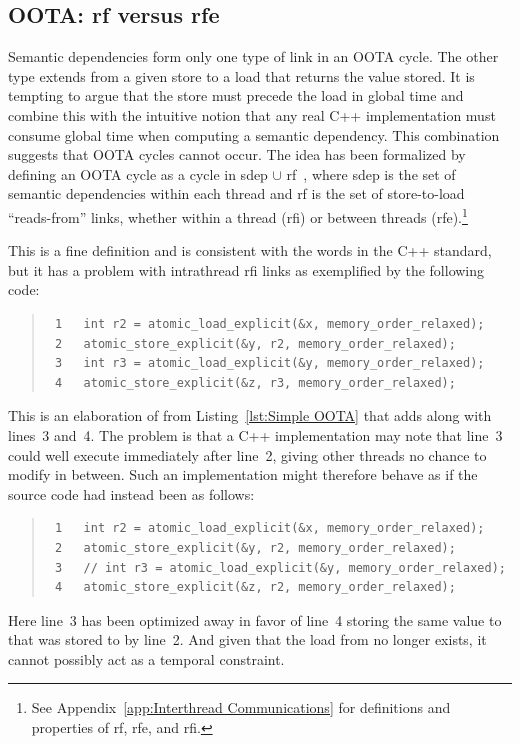 \documentclass[10]{article}
\begin{document}
\subsection{OOTA: rf versus rfe}
\label{sec:OOTA: rf versus rfe}

Semantic dependencies form only one type of link in an OOTA cycle.
The other type extends from a given store to a load that returns the
value stored.
It is tempting to argue that the store must precede
the load in global time and combine this with the intuitive notion that
any real C++ implementation must consume global time when computing a
semantic dependency.
This combination suggests that OOTA cycles cannot occur.
The idea has been formalized by defining an OOTA cycle as a cycle
in sdep $\cup$ rf~\cite{PaulEMcKenney2014OOTA},
where sdep is the set of semantic dependencies within
each thread and rf is the set of store-to-load ``reads-from'' links,
whether within a thread
(rfi) or between threads (rfe).\footnote{
	See Appendix~\ref{app:Interthread Communications} for definitions
	and properties of rf, rfe, and rfi.}

This is a fine definition and is consistent with the words in the C++
standard, but it has a problem with intrathread rfi links
as exemplified by the following code:
\begin{quote}
\scriptsize
\begin{verbatim}
 1   int r2 = atomic_load_explicit(&x, memory_order_relaxed);
 2   atomic_store_explicit(&y, r2, memory_order_relaxed);
 3   int r3 = atomic_load_explicit(&y, memory_order_relaxed);
 4   atomic_store_explicit(&z, r3, memory_order_relaxed);
\end{verbatim}
\end{quote}
This is an elaboration of  from
Listing~\ref{lst:Simple OOTA}
that adds  along with lines~3 and~4.
The problem is that a C++ implementation may
note that line~3 could well execute immediately after line~2, giving
other threads no chance to modify  in between.
Such an implementation might therefore behave as if the source code
had instead been as follows:
\begin{quote}
\scriptsize
\begin{verbatim}
 1   int r2 = atomic_load_explicit(&x, memory_order_relaxed);
 2   atomic_store_explicit(&y, r2, memory_order_relaxed);
 3   // int r3 = atomic_load_explicit(&y, memory_order_relaxed);
 4   atomic_store_explicit(&z, r2, memory_order_relaxed);
\end{verbatim}
\end{quote}
Here line~3 has been optimized away in favor of line~4 storing the same value
to  that was stored to  by line~2.
And given that the load from  no longer exists, it cannot possibly
act as a temporal constraint.
\end{document}
